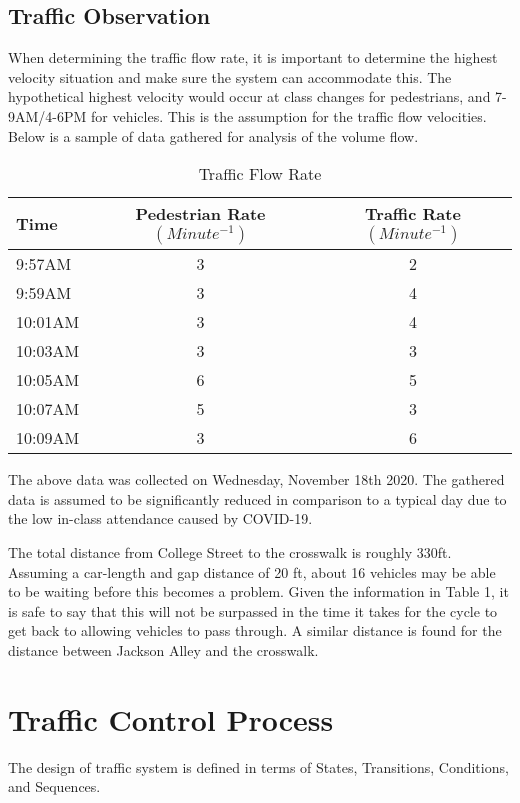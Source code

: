 \documentclass{article}
\begin{document}
\subsection{Traffic Observation}
When determining the traffic flow rate, it is important to determine the highest velocity situation and make sure the system can accommodate this. The hypothetical highest velocity would occur at class changes for pedestrians, and 7-9AM/4-6PM for vehicles. This is the assumption for the traffic flow velocities. Below is a sample of data gathered for analysis of the volume flow.

\begin{table}[h!]
  \begin{center}
    \caption{Traffic Flow Rate}
    \label{tab:table1}
    \begin{tabular}{l|c|c}
      \textbf{Time} & \textbf{Pedestrian Rate $\left(Minute^{-1}\right)$} & \textbf{Traffic Rate $\left(Minute^{-1}\right)$}\\
      \hline
      9:57AM & 3 & 2\\
      9:59AM & 3 & 4\\
      10:01AM & 3 & 4\\
      10:03AM & 3 & 3\\
      10:05AM & 6 & 5\\
      10:07AM & 5 & 3\\
      10:09AM & 3 & 6
    \end{tabular}
  \end{center}
\end{table}

\vspace{2in}

The above data was collected on Wednesday, November 18th 2020. The gathered data is assumed to be significantly reduced in comparison to a typical day due to the low in-class attendance caused by COVID-19.

The total distance from College Street to the crosswalk is roughly 330ft. Assuming a car-length and gap distance of 20 ft, about 16 vehicles may be able to be waiting before this becomes a problem. Given the information in Table 1, it is safe to say that this will not be surpassed in the time it takes for the cycle to get back to allowing vehicles to pass through. A similar distance is found for the distance between Jackson Alley and the crosswalk.


\section{Traffic Control Process}
The design of traffic system is defined in terms of States, Transitions, Conditions, and Sequences.
\end{document}
